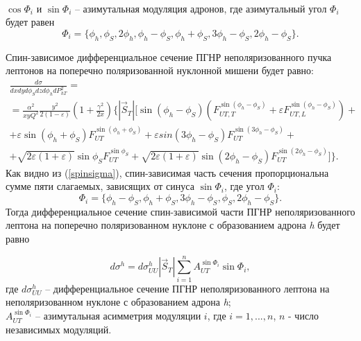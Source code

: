 \documentclass{extreport}
\begin{document}
\\
$\cos \Phi_i$ и $ \sin \Phi_i$ -- азимутальная модуляция адронов, где азимутальный угол $\Phi_i$ будет равен 
\begin{equation}
	\Phi_i =  \lbrace \phi_h, \phi_S, 2\phi_h, \phi_h - \phi_S, \phi_h + \phi_S, 3\phi_h - \phi_S, 2\phi_h - \phi_S \rbrace.
\end{equation}

Спин-зависимое дифференциальное сечение ПГНР неполяризованного пучка лептонов на поперечно поляризованной нуклонной мишени будет равно:
\begin{multline}
	\label{spinsigma}
	\frac{d\sigma}{dx dy d \phi_S dz d \phi_{h} dP^{2}_{h T}} = \\
	= \frac{\alpha^2}{xy Q^{2}} \frac{y^2}{2 (1 - \varepsilon)} \left(1 + \frac{\gamma^2}{2x} \right) \Biggl \lbrace 	
	 |\vec S_{T}| \Biggl[ \sin(\phi_h - \phi_S) \left(F_{U T, T}^{\sin(\phi_h - \phi_S)} +
	\varepsilon F_{UT, L}^{\sin(\phi_h - \phi_S)} \right) + \\
	+ \varepsilon \sin(\phi_h + \phi_S) F_{U T}^{\sin (\phi_h + \phi_S)} +
	\varepsilon sin (3\phi_h - \phi_S) F_{UT}^{\sin (3\phi_h - \phi_S)} + \\
	+ \sqrt{2 \varepsilon (1 + \varepsilon)} \sin \phi_S F_{UT}^{\sin \phi_S} +
	\sqrt{2 \varepsilon (1 + \varepsilon)} \sin(2\phi_h - \phi_S) F_{UT}^{\sin(2\phi_h - \phi_S)}  \Biggr ]\Biggr \rbrace.
\end{multline}
Как видно из (\ref{spinsigma}), спин-зависимая часть сечения пропорциональна сумме пяти слагаемых, зависящих от синуса $\sin \Phi_i$, где угол $\Phi_i$:  
\begin{equation}
	\Phi_i = \lbrace \phi_h - \phi_S, \phi_h + \phi_S, 3\phi_h - \phi_S, \phi_S,2 \phi_h - \phi_S \rbrace. 
\end{equation}
Тогда дифференциальное сечение спин-зависимой части ПГНР неполяризованного лептона на поперечно поляризованном нуклоне с образованием адрона \textit{h} будет равно

\begin{equation}
	\label{eq:asym}
	d\sigma^h = d\sigma^h_{UU} |\vec S_{T}| \sum_{i = 1}^n A_{UT}^{\sin \Phi_i} \sin \Phi_i,
\end{equation}
где $d\sigma^h_{UU}$ -- дифференциальное сечение ПГНР неполяризованного лептона на неполяризованном нуклоне с образованием адрона \textit{h}; \\ $A_{UT}^{\sin \Phi_i}$ -- азимутальная асимметрия модуляции $i$, где $i = 1, ... , n$, $n$ - число независимых модуляций.
\end{document}
